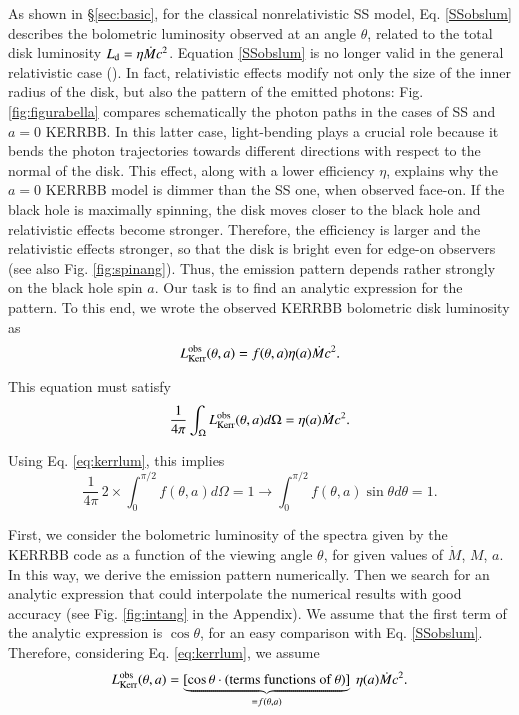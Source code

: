 \documentclass{aa}
\begin{document}
As shown in \S \ref{sec:basic}, for the classical nonrelativistic SS model, Eq. \eqref{SSobslum} describes the bolometric luminosity observed at an angle $\theta$, related to the total disk luminosity $L_{\rm d} = \eta \dot{M} c^2$. Equation \eqref{SSobslum} is no longer valid in the general relativistic case (\citealt{Cunnin}). In fact, relativistic effects modify not only the size of the inner radius of the disk, but also the pattern of the emitted photons: Fig. \ref{fig:figurabella} compares schematically the photon paths in the cases of SS and $a = 0$ KERRBB. In this latter case, light-bending plays a crucial role because it bends the photon trajectories towards different directions with respect to the normal of the disk. This effect, along with a lower efficiency $\eta$, explains why the $a = 0$ KERRBB model is dimmer than the SS one, when observed face-on. If the black hole is maximally spinning, the disk moves closer to the black hole and relativistic effects become stronger. Therefore, the efficiency is larger and the relativistic effects stronger, so that the disk is bright even for edge-on observers (see also Fig. \ref{fig:spinang}). Thus, the emission pattern depends rather strongly on the black hole spin $a$. Our task is to find an analytic expression for the pattern. To this end, we wrote the observed KERRBB bolometric disk luminosity as
	\begin{equation} \label{eq:kerrlum}
		L^{\rm obs}_{\rm Kerr} (\theta, a) = f(\theta, a) \eta(a) \dot{M} c^2.
	\end{equation}

\noindent This equation must satisfy
	\begin{equation} \label{eq:kerrlum2}
		\frac{1}{4 \pi} \int_{\Omega} L^{\rm obs}_{\rm Kerr} (\theta, a) d \Omega = \eta(a) \dot{M} c^2.
	\end{equation}

\noindent Using Eq. \ref{eq:kerrlum}, this implies
	\begin{equation} \label{eq:normalization}
		{\frac{1}{4 \pi}}\,2\times  \int_{0}^{\pi/2} f(\theta, a) d \Omega = 1  \to
\int_{0}^{\pi/2} f(\theta, a) \sin \theta d \theta = 1.
	\end{equation}

First, we consider the bolometric luminosity of the spectra given by the KERRBB code as a function of the viewing angle $\theta$, for given values of $\dot{M}$, $M$, $a$. In this way, we derive the emission pattern numerically. Then we search for an analytic expression that could interpolate the numerical results with good accuracy (see Fig. \ref{fig:intang} in the Appendix). We assume that the first term of the analytic expression is $\cos \theta$, for an easy comparison with Eq. \eqref{SSobslum}. Therefore, considering Eq. \eqref{eq:kerrlum}, we assume
	\begin{equation} \label{eq:kerrlum3}
		L^{\rm obs}_{\rm Kerr} (\theta, a) = 
\underbrace{[ \cos \theta \cdot (\text{terms functions of $\theta$})]}_{= f(\theta, a)} \ \eta(a) \dot{M} c^2.
	\end{equation}
\end{document}
